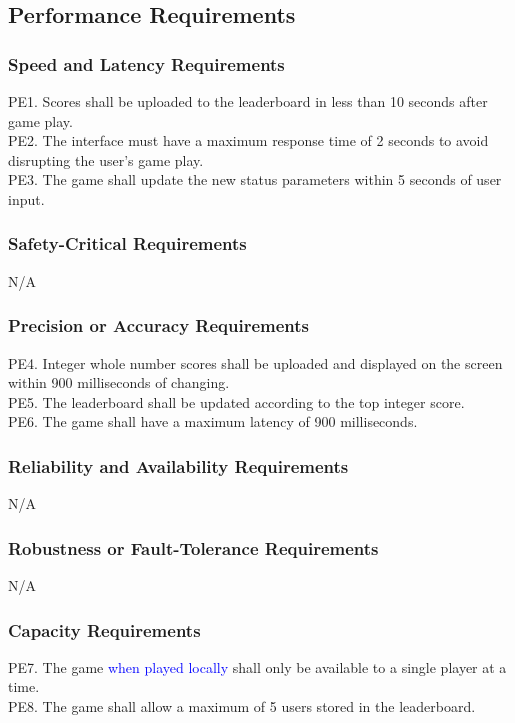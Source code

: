 \documentclass[12pt]{article}
\begin{document}
	\subsection{Performance Requirements}
	\subsubsection{Speed and Latency Requirements}
	PE1. Scores shall be uploaded to the leaderboard in less than 10 seconds after game play.\\
	PE2. The interface must have a maximum response time of 2 seconds to avoid disrupting the user's game play.\\
	PE3. The game shall update the new status parameters within 5 seconds of user input.
	
	\subsubsection{Safety-Critical Requirements}
	N/A
	
	\subsubsection{Precision or Accuracy Requirements}
	PE4. Integer whole number scores shall be uploaded and displayed on the screen within 900 milliseconds of changing.\\
	PE5. The leaderboard shall be updated according to the top integer score.\\
	PE6. The game shall have a maximum latency of 900 milliseconds.
	
	\subsubsection{Reliability and Availability Requirements}
	N/A
	
	\subsubsection{Robustness or Fault-Tolerance Requirements}
	N/A
	
	\subsubsection{Capacity Requirements}
	PE7. The game \textcolor{blue}{when played locally} shall only be available to a single player at a time.\\
	PE8. The game shall allow a maximum of 5 users stored in the leaderboard.
	
\end{document}
